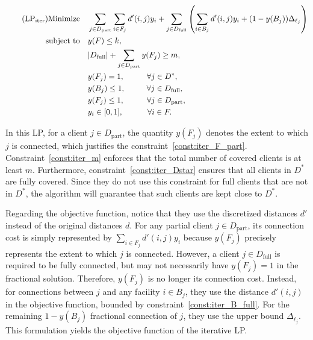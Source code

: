 \begin{align} \tag{$\text{LP}_{\text{iter}}$} \label{LP-iter}
\text{Minimize} \quad & \sum_{j \in D_\text{part}} \sum_{i \in F_j} d'(i,j) y_i + \sum_{j \in D_\text{full}} \left( \sum_{i \in B_j} d'(i,j) y_i + (1 - y(B_j)) \Delta_{\ell_j} \right) \\
\text{subject to} \quad & y(F) \leq k, \label{const:iter_k} \\
& |D_\text{full}| + \sum_{j \in D_\text{part}} y(F_j) \geq m, \label{const:iter_m} \\
& y(F_j) = 1, \hspace{1cm} \forall j \in D^*, \label{const:iter_Dstar} \\
& y(B_j) \leq 1, \hspace{0.95cm} \forall j \in D_\text{full}, \label{const:iter_B_full} \\
& y(F_j) \leq 1, \hspace{1cm} \forall j \in D_\text{part}, \label{const:iter_F_part} \\
& y_i \in [0,1], \hspace{1.08cm} \forall i \in F. \label{const:iter_domain}
\end{align}


In this LP, for a client $j \in D_\text{part}$, the quantity $y(F_j)$ denotes the extent to which $j$ is connected, which justifies the constraint~\eqref{const:iter_F_part}. Constraint~\eqref{const:iter_m} enforces that the total number of covered clients is at least $m$. Furthermore, constraint~\eqref{const:iter_Dstar} ensures that all clients in $D^*$ are fully covered. Since they do not use this constraint for full clients that are not in $D^*$, the algorithm will guarantee that such clients are kept close to $D^*$.

Regarding the objective function, notice that they use the discretized distances $d'$ instead of the original distances $d$. For any partial client $j \in D_\text{part}$, its connection cost is simply represented by $\sum_{i \in F_j} d'(i, j)y_i$ because $y(F_j)$ precisely represents the extent to which $j$ is connected. However, a client $j \in D_\text{full}$ is required to be fully connected, but may not necessarily have $y(F_j) = 1$ in the fractional solution. Therefore, $y(F_j)$ is no longer its connection cost. Instead, for connections between $j$ and any facility $i \in B_j$, they use the distance $d'(i, j)$ in the objective function, bounded by constraint~\eqref{const:iter_B_full}. For the remaining $1 - y(B_j)$ fractional connection of $j$, they use the upper bound $\Delta_{\ell_j}$. This formulation yields the objective function of the iterative LP.


